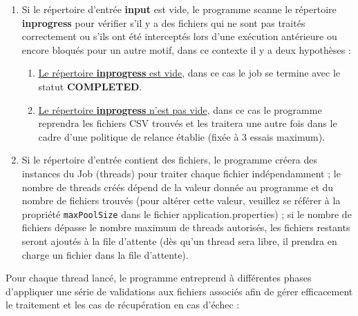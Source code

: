 \begin{enumerate}
    \item Si le répertoire d'entrée \textbf{input} est vide, le programme scanne le répertoire \textbf{inprogress} pour vérifier s'il y a des fichiers qui ne sont pas traités correctement ou s'ils ont été interceptés lors d'une exécution antérieure ou encore bloqués pour un autre motif, dans ce contexte il y a deux hypothèses :
    \begin{enumerate}
        \item \underline{Le répertoire \textbf{inprogress} est vide}, dans ce cas le job se termine avec le statut \textbf{COMPLETED}.
        \item \underline{Le répertoire \textbf{inprogress} n'est pas vide}, dans ce cas le programme reprendra les fichiers CSV trouvés et les traitera une autre fois dans le cadre d'une politique de relance établie (fixée à 3 essais maximum).
    \end{enumerate}
    \item Si le répertoire d'entrée contient des fichiers, le programme créera des instances du Job (threads) pour traiter chaque fichier indépendamment ; le nombre de threads créés dépend de la valeur donnée au programme et du nombre de fichiers trouvés (pour altérer cette valeur, veuillez se référer à la propriété \lstinline|maxPoolSize| dans le fichier application.properties) ; si le nombre de fichiers dépasse le nombre maximum de threads autorisés, les fichiers restants seront ajoutés à la file d'attente (dès qu'un thread sera libre, il prendra en charge un fichier dans la file d'attente).\\
\end{enumerate}
Pour chaque thread lancé, le programme entreprend à différentes phases d'appliquer une série de validations aux fichiers associés afin de gérer efficacement le traitement et les cas de récupération en cas d'échec :
